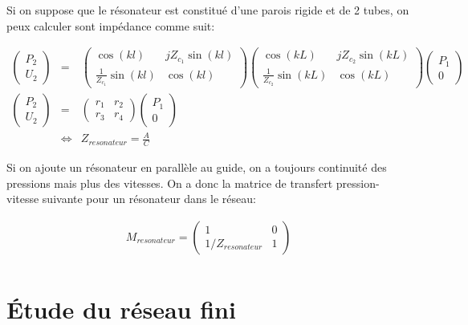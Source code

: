 Si on suppose que le résonateur est constitué d'une parois rigide et de 2 tubes, on peux calculer sont impédance comme suit:

\begin{eqnarray*}
\begin{pmatrix} P_2 \\U_2 \end{pmatrix} & = & \begin{pmatrix} \cos(k l) & j Z_{c_1} \sin(k l) \\ \frac{1}{Z_{c_1}} \sin(k l) & \cos(k l) \end{pmatrix} \begin{pmatrix} \cos(k L) & j Z_{c_2} \sin(k L) \\ \frac{1}{Z_{c_2}} \sin(k L) & \cos(k L) \end{pmatrix} \begin{pmatrix} P_1 \\ 0  \end{pmatrix} \\
\begin{pmatrix} P_2 \\U_2 \end{pmatrix} & = & \begin{pmatrix} r_1 & r_2 \\ r_3 & r_4 \end{pmatrix} \begin{pmatrix} P_1 \\ 0  \end{pmatrix} \\
~ & \Leftrightarrow & Z_{resonateur} = \frac{A}{C}
\end{eqnarray*}

Si on ajoute un résonateur en parallèle au guide, on a toujours continuité des pressions mais plus des vitesses. On a donc la matrice de transfert pression-vitesse suivante pour un résonateur dans le réseau:

\begin{eqnarray*}
M_{resonateur} = \begin{pmatrix} 1 &  0 \\ 1 /Z_{resonateur} & 1  \end{pmatrix}\\
\end{eqnarray*}

\section{Étude du réseau fini}

